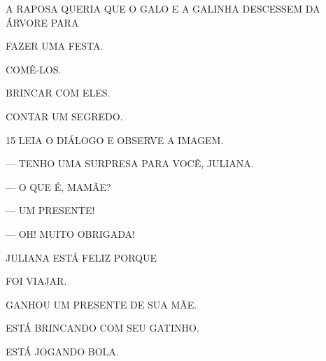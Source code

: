 A RAPOSA QUERIA QUE O GALO E A GALINHA DESCESSEM DA ÁRVORE PARA

\begin{escolha}
\item FAZER UMA FESTA.

\item COMÊ-LOS.

\item BRINCAR COM ELES.

\item CONTAR UM SEGREDO.
\end{escolha}

\num{15} LEIA O DIÁLOGO E OBSERVE A IMAGEM.



— TENHO UMA SURPRESA PARA VOCÊ, JULIANA.

— O QUE É, MAMÃE?

— UM PRESENTE!

— OH! MUITO OBRIGADA!

JULIANA ESTÁ FELIZ PORQUE

\begin{escolha}
\item FOI VIAJAR.

\item GANHOU UM PRESENTE DE SUA MÃE.

\item ESTÁ BRINCANDO COM SEU GATINHO.

\item ESTÁ JOGANDO BOLA.
\end{escolha}



